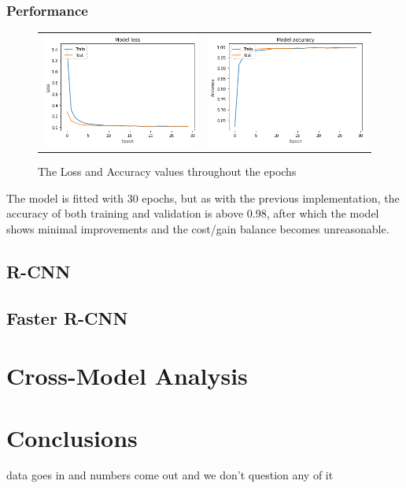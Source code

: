 \documentclass[12pt, landscape]{article}
\begin{document}
\begin{multicols}{3}
\subsubsection{Performance}
\begin{figure}[H]
    \centering
    \begin{tabular}{cc}
    \includegraphics[scale=0.45]{Kresult1.png}&
    \includegraphics[scale=0.45]{Kresult.png}\\
    \end{tabular}
    \caption{The Loss and Accuracy values throughout the epochs}
    \label{fig:CNNKaccuracy}
\end{figure}
The model is fitted with 30 epochs, but as with the previous implementation, the
accuracy of both training and validation is above 0.98, after which the model
shows minimal improvements and the cost/gain balance becomes unreasonable.

\subsection{R-CNN}
\subsection{Faster R-CNN}

\section{Cross-Model Analysis}

\section{Conclusions}
data goes in and numbers come out and we don't question any of it




\end{multicols}
\end{document}

